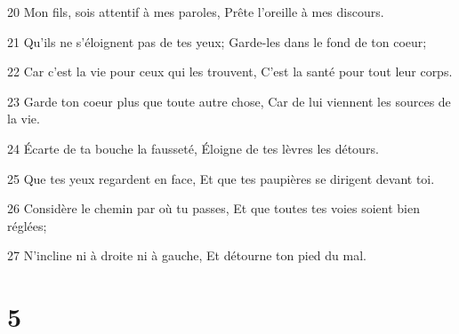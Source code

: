 \par 20 Mon fils, sois attentif à mes paroles, Prête l'oreille à mes discours.
\par 21 Qu'ils ne s'éloignent pas de tes yeux; Garde-les dans le fond de ton coeur;
\par 22 Car c'est la vie pour ceux qui les trouvent, C'est la santé pour tout leur corps.
\par 23 Garde ton coeur plus que toute autre chose, Car de lui viennent les sources de la vie.
\par 24 Écarte de ta bouche la fausseté, Éloigne de tes lèvres les détours.
\par 25 Que tes yeux regardent en face, Et que tes paupières se dirigent devant toi.
\par 26 Considère le chemin par où tu passes, Et que toutes tes voies soient bien réglées;
\par 27 N'incline ni à droite ni à gauche, Et détourne ton pied du mal.

\chapter{5}

